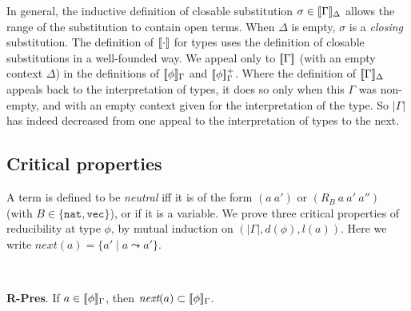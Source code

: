 \documentclass[copyright]{eptcs}
\newcommand{\next}[0]{\textit{next}}
\newcommand{\vc}[0]{\texttt{vec}}
\newcommand{\nat}[0]{\texttt{nat}}
\newcommand{\interp}[1]{[\negthinspace[#1]\negthinspace]}
\begin{document}
In general, the inductive definition of closable substitution
$\sigma\in\interp{\Gamma}_{\Delta}$ allows the range of the
substitution to contain open terms.  When $\Delta$ is empty, $\sigma$
is a \emph{closing} substitution.  The definition of $\interp{\cdot}$
for types uses the definition of closable substitutions in a
well-founded way.  We appeal only to $\interp{\Gamma}$ (with an empty
context $\Delta$) in the definitions of $\interp{\phi}_\Gamma$ and
$\interp{\phi}^+_\Gamma$.  Where the definition of
$\interp{\Gamma}_\Delta$ appeals back to the interpretation of types,
it does so only when this $\Gamma$ was non-empty, and with an empty
context given for the interpretation of the type.  So $|\Gamma|$ has
indeed decreased from one appeal to the interpretation of types to the
next.

\begin{comment}
The notion of closable substitution depends on the equally important
concept of a \emph{closable} term $a$, with notation
$a\in\interp{\phi}^+_\Gamma$.  Intuitively, a term $a$ in the
interpretation of a type $\phi$ in context $\Gamma$ is closable iff
being in the interpretation is preserved for all nontrivial closing
substitutions.

Finally, the clause for $\vc$-types is complicated by two issues.
First, $\vc$-types are parameterized by a type, and so we must ensure
that subdata are reducible at the appropriate types.  Second,
$\vc$-types are indexed (by the length of the list), and so we must
specify that the length is equal to $0$ in the first case; and equal
to some $l'$ that can serve as the length of the sublist ($a''$), in
the second.  These equalities are stated using $a \sim_\Gamma a'$.
\end{comment}

\subsection{Critical properties}
\label{sec:critprop}

A term is defined to be \emph{neutral} iff it is of the form $(a\ a')$
or $(R_B\ a\ a'\ a'')$ (with $B \in \{\nat, \vc\}$), or if it is a
variable.  We prove three critical properties of reducibility at type
$\phi$, by mutual induction on $(|\Gamma|,d(\phi),l(a))$.  Here we
write $\next(a) = \{ a' \mid a \leadsto a' \}$.

\ 

\noindent \textbf{R-Pres}. If $a\in\interp{\phi}_\Gamma$, then $\next(a)\subset\interp{\phi}_\Gamma$.
\end{document}
